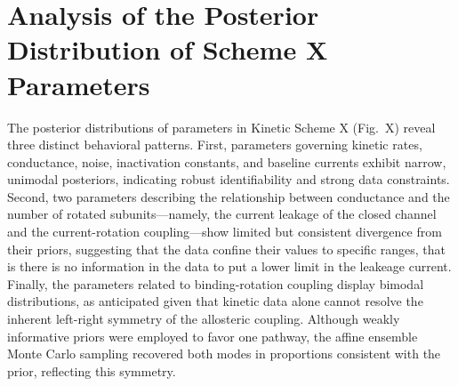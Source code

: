 \documentclass[pdflatex,sn-mathphys-num]{sn-jnl}%
\theoremstyle{thmstyleone}%
\theoremstyle{thmstyletwo}%
\theoremstyle{thmstylethree}%
\begin{document}
\section{Analysis of the Posterior Distribution of Scheme X Parameters}

The posterior distributions of parameters in Kinetic Scheme X (Fig.~X) reveal three distinct behavioral patterns. First, parameters governing kinetic rates, conductance, noise, inactivation constants, and baseline currents exhibit narrow, unimodal posteriors, indicating robust identifiability and strong data constraints. Second, two parameters describing the relationship between conductance and the number of rotated subunits---namely, the current leakage of the closed channel and the current-rotation coupling---show limited but consistent divergence from their priors, suggesting that the data confine their values to specific ranges, that is there is no information in the data to put a lower limit in the leakeage current. 
Finally, the parameters related to binding-rotation coupling display bimodal distributions, as anticipated given that kinetic data alone cannot resolve the inherent left-right symmetry of the allosteric coupling. Although weakly informative priors were employed to favor one pathway, the affine ensemble Monte Carlo sampling recovered both modes in proportions consistent with the prior, reflecting this symmetry.
\end{document}
